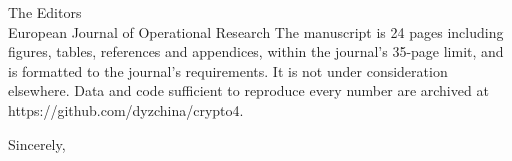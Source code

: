 \documentclass[11pt]{letter}
\begin{document}
\begin{letter}{The Editors\\European Journal of Operational Research}
The manuscript is 24 pages including figures, tables, references and appendices, within the journal's 35-page limit, and is formatted to the journal's requirements. It is not under consideration elsewhere. Data and code sufficient to reproduce every number are archived at https://github.com/dyzchina/crypto4.

\closing{Sincerely,}
\end{letter}
\end{document}
